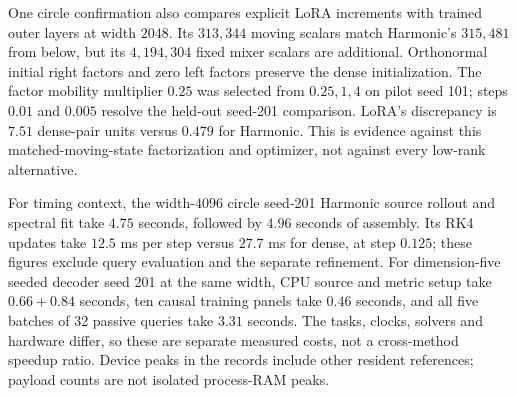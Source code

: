 One circle confirmation also compares explicit LoRA increments with trained
outer layers at width $2048$. Its $313{,}344$ moving scalars match Harmonic's
$315{,}481$ from below, but its $4{,}194{,}304$ fixed mixer scalars are additional.
Orthonormal initial right factors and zero left factors preserve the dense
initialization. The factor mobility multiplier $0.25$ was selected from
$0.25,1,4$ on pilot seed 101; steps $0.01$ and $0.005$ resolve the held-out
seed-201 comparison. LoRA's discrepancy is $7.51$ dense-pair units versus
$0.479$ for Harmonic. This is evidence against this matched-moving-state
factorization and optimizer, not against every low-rank alternative.

For timing context, the width-$4096$ circle seed-201 Harmonic source rollout
and spectral fit take $4.75$ seconds, followed by $4.96$ seconds of assembly.
Its RK4 updates take $12.5$ ms per step versus $27.7$ ms for dense, at step
$0.125$; these figures exclude query evaluation and the separate refinement.
For dimension-five seeded decoder seed 201 at the same width, CPU source and
metric setup take $0.66+0.84$ seconds, ten causal training panels take $0.46$
seconds, and all five batches of 32 passive queries take $3.31$ seconds.
The tasks, clocks, solvers and hardware differ, so these are separate measured
costs, not a cross-method speedup ratio. Device peaks in the records include
other resident references; payload counts are not isolated process-RAM peaks.

